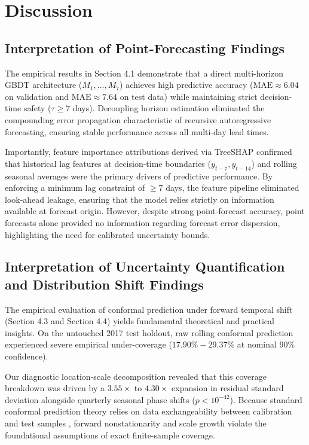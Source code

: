 \section{Discussion}

\subsection{Interpretation of Point-Forecasting Findings}
The empirical results in Section 4.1 demonstrate that a direct multi-horizon GBDT architecture ($M_1, \dots, M_7$) achieves high predictive accuracy ($\text{MAE} \approx 6.04$ on validation and $\text{MAE} \approx 7.64$ on test data) while maintaining strict decision-time safety ($\tau \ge 7$ days). Decoupling horizon estimation eliminated the compounding error propagation characteristic of recursive autoregressive forecasting, ensuring stable performance across all multi-day lead times.

Importantly, feature importance attributions derived via TreeSHAP confirmed that historical lag features at decision-time boundaries ($y_{t-7}, y_{t-14}$) and rolling seasonal averages were the primary drivers of predictive performance. By enforcing a minimum lag constraint of $\ge 7$ days, the feature pipeline eliminated look-ahead leakage, ensuring that the model relies strictly on information available at forecast origin. However, despite strong point-forecast accuracy, point forecasts alone provided no information regarding forecast error dispersion, highlighting the need for calibrated uncertainty bounds.

\subsection{Interpretation of Uncertainty Quantification and Distribution Shift Findings}
The empirical evaluation of conformal prediction under forward temporal shift (Section 4.3 and Section 4.4) yields fundamental theoretical and practical insights. On the untouched 2017 test holdout, raw rolling conformal prediction experienced severe empirical under-coverage ($17.90\%-29.37\%$ at nominal $90\%$ confidence).

Our diagnostic location-scale decomposition revealed that this coverage breakdown was driven by a $3.55\times$ to $4.30\times$ expansion in residual standard deviation alongside quarterly seasonal phase shifts ($p < 10^{-42}$). Because standard conformal prediction theory relies on data exchangeability between calibration and test samples \cite{vovk2005algorithmic, angelopoulos2021gentle}, forward nonstationarity and scale growth violate the foundational assumptions of exact finite-sample coverage.


